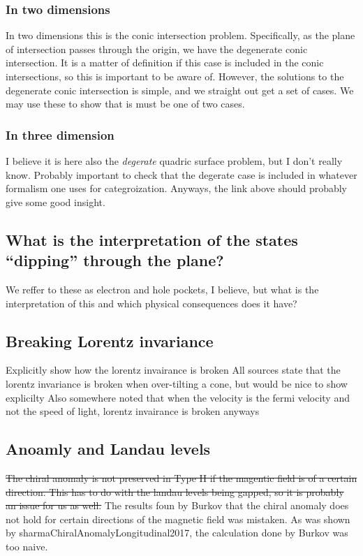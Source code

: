 \documentclass[11pt]{article}
\begin{document}
\subsubsection{In two dimensions}
\label{sec:org8388d37}
In two dimensions this is the conic intersection problem.
Specifically, as the plane of intersection passes through the origin, we have the degenerate conic intersection.
It is a matter of definition if this case is included in the conic intersections, so this is important to be aware of.
However, the solutions to the degenerate conic intersection is simple, and we straight out get a set of cases.
We may use these to show that is must be one of two cases.

\subsubsection{In three dimension}
\label{sec:orgcaec31d}
I believe it is here also the \emph{degerate} quadric surface problem, but I don't really know.
Probably important to check that the degerate case is included in whatever formalism one uses for categroization.
Anyways, the link above should probably give some good insight.

\subsection{What is the interpretation of the states ``dipping'' through the plane?}
\label{sec:org29cec00}
We reffer to these as electron and hole pockets, I believe, but what is the interpretation of this and which physical consequences does it have?

\subsection{Breaking Lorentz invariance}
\label{sec:orgde4474d}
Explicitly show how the lorentz invairance is broken
All sources state that the lorentz invariance is broken when over-tilting a cone, but would be nice to show explicilty
Also somewhere noted that when the velocity is the fermi velocity and not the speed of light, lorentz invairance is broken anyways

\subsection{Anoamly and Landau levels}
\label{sec:orgada1378}

\sout{The chiral anomaly is not preserved in Type II if the magentic field is of a certain direction.
This has to do with the landau levels being gapped, so it is probably an issue for us as well.}
The results foun by Burkov that the chiral anomaly does not hold for certain directions of the magnetic field was mistaken.
As was shown by sharmaChiralAnomalyLongitudinal2017, the calculation done by Burkov was too naive.
\end{document}

